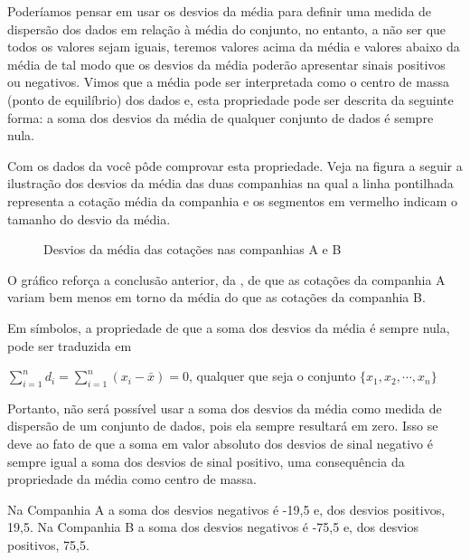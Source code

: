 Poderíamos pensar em usar os desvios da média para definir uma medida de dispersão dos dados em relação à média do conjunto, no entanto, a não ser que todos os valores sejam iguais, teremos valores acima da média e valores abaixo da média de tal modo que os desvios da média poderão apresentar sinais positivos ou negativos. Vimos que a média pode ser interpretada como o centro de massa (ponto de equilíbrio) dos dados e, esta propriedade pode ser descrita da seguinte forma: a soma dos desvios da média de qualquer conjunto de dados é sempre nula.

Com os dados da  você pôde comprovar esta propriedade. Veja na figura a seguir a ilustração dos desvios da média das duas companhias na qual a linha pontilhada representa a cotação média da companhia e os segmentos em vermelho indicam o tamanho do desvio da média.

\begin{figure}[H]
\centering
\capstart

\noindent{}
\caption{Desvios da média das cotações nas companhias A e B}\label{\detokenize{PE104-4:fig-desvios-da-media}}\label{\detokenize{PE104-4:id3}}\end{figure}

O gráfico {\hyperref[\detokenize{PE104-4:fig-desvios-da-media}]{}} reforça a conclusão anterior, da , de que as cotações da companhia A variam bem menos em torno da média do que as cotações da companhia B.

Em símbolos, a propriedade de que a soma dos desvios da média é sempre nula, pode ser traduzida em

\(\displaystyle{\sum^n_{i=1}} d_i=\displaystyle{\sum^n_{i=1}} (x_i-\bar{x})=0\), qualquer que seja o conjunto \(\{ x_1,x_2,\cdots, x_n\}\)

Portanto, não será possível usar a soma dos desvios da média como medida de dispersão de um conjunto de dados, pois ela sempre resultará em zero. Isso se deve ao fato de que a soma em valor absoluto dos desvios de sinal negativo é sempre igual a soma dos desvios de sinal positivo, uma consequência da propriedade da média como centro de massa.

Na Companhia A a soma dos desvios negativos é -19,5 e, dos desvios positivos, 19,5. Na Companhia B a soma dos desvios negativos é -75,5 e, dos desvios positivos, 75,5.

